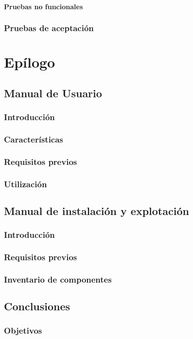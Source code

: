 \documentclass[12pt,letterpaper]{report}
\begin{document}
		\subsubsection{Pruebas no funcionales}
	\subsection{Pruebas de aceptación}
\chapter{Epílogo}
\section{Manual de Usuario}
	\subsection{Introducción}
	\subsection{Características}
	\subsection{Requisitos previos}
	\subsection{Utilización}

\section{Manual de instalación y explotación}
	\subsection{Introducción}
	\subsection{Requisitos previos}
	\subsection{Inventario de componentes}

\section{Conclusiones}
	\subsection{Objetivos}
\end{document}

